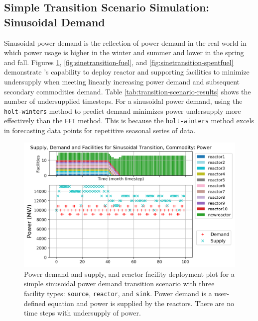     \subsection{Simple Transition Scenario Simulation: Sinusoidal Demand}
    Sinusoidal power demand is the reflection of power demand in 
    the real world in which power usage is higher in the winter and summer
    and lower in the spring and fall. 
    Figures \ref{fig:sinetransition-power}, \ref{fig:sinetransition-fuel},
    and \ref{fig:sinetransition-spentfuel} demonstrate \deploy's capability 
    to deploy reactor and supporting facilities to minimize undersupply 
    when meeting linearly increasing power demand and subsequent secondary 
    commodities demand. 
    Table \ref{tab:transition-scenario-results} shows the number of 
    undersupplied timesteps.
    For a sinusoidal power demand, using the 
    \texttt{holt-winters} method to predict demand minimizes 
    power undersupply more effectively than the \texttt{FFT} method. 
    This is because the \texttt{holt-winters} method excels in
    forecasting data points for repetitive seasonal series of data. 

    \begin{figure}[]
        \centering
        \includegraphics[width=0.8\linewidth]{figures/sinetransition-power.png} 
            \caption{Power demand and supply, and reactor facility deployment plot for  
            a simple sinusoidal power demand transition scenario with 
            three facility types: \texttt{source}, \texttt{reactor}, and \texttt{sink}.
            Power demand is a user-defined equation and power is supplied by the reactors.
            There are no time steps with undersupply of power.}
            \label{fig:sinetransition-power}
    \end{figure}
    
